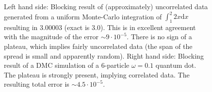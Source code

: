 \begin{figure}
 \begin{center}
  \caption{Left hand side: Blocking result of (approximately) uncorrelated data generated from a uniform Monte-Carlo integration of $\int _1^2 2x\mathrm{d}x$ resulting in $3.00003$ (exact is $3.0$). This is in excellent agreement with the magnitude of the error $\sim 9\cdot 10^{-5}$. There is no sign of a plateau, which implies fairly uncorrelated data (the span of the spread is small and apparently random). Right hand side: Blocking result of a DMC simulation of a 6-particle $\omega=0.1$ quantum dot. The plateau is strongly present, implying correlated data. The resulting total error is  $\sim 4.5\cdot 10^{-5}$.}
  \label{FIG:BlockingExamples}
 \end{center}
\end{figure}


